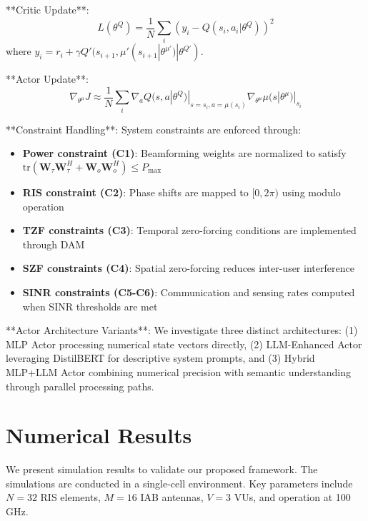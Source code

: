 \documentclass[journal]{IEEEtran}
\begin{document}
**Critic Update**:
\begin{equation}
L(\theta^Q) = \frac{1}{N} \sum_i (y_i - Q(s_i, a_i | \theta^Q))^2
\end{equation}
where $y_i = r_i + \gamma Q'(s_{i+1}, \mu'(s_{i+1} | \theta^{\mu'}) | \theta^{Q'})$.

**Actor Update**:
\begin{equation}
\nabla_{\theta^{\mu}} J \approx \frac{1}{N} \sum_i \nabla_{a} Q(s, a | \theta^Q)|_{s=s_i, a=\mu(s_i)} \nabla_{\theta^\mu} \mu(s | \theta^\mu)|_{s_i}
\end{equation}

**Constraint Handling**: System constraints are enforced through:
\begin{itemize}
\item \textbf{Power constraint (C1)}: Beamforming weights are normalized to satisfy $\text{tr}(\mathbf{W}_\tau \mathbf{W}_\tau^H + \mathbf{W}_o \mathbf{W}_o^H) \leq P_{\max}$
\item \textbf{RIS constraint (C2)}: Phase shifts are mapped to $[0, 2\pi)$ using modulo operation
\item \textbf{TZF constraints (C3)}: Temporal zero-forcing conditions are implemented through DAM
\item \textbf{SZF constraints (C4)}: Spatial zero-forcing reduces inter-user interference
\item \textbf{SINR constraints (C5-C6)}: Communication and sensing rates computed when SINR thresholds are met
\end{itemize}

**Actor Architecture Variants**: We investigate three distinct architectures: (1) MLP Actor processing numerical state vectors directly, (2) LLM-Enhanced Actor leveraging DistilBERT for descriptive system prompts, and (3) Hybrid MLP+LLM Actor combining numerical precision with semantic understanding through parallel processing paths.

\section{Numerical Results}\label{Sec:NumResults}

We present simulation results to validate our proposed framework. The simulations are conducted in a single-cell environment. Key parameters include $N = 32$ RIS elements, $M = 16$ IAB antennas, $V = 3$ VUs, and operation at 100 GHz.
\end{document}
